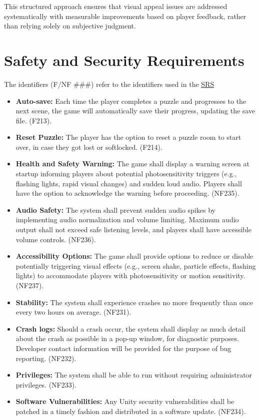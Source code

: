 \documentclass{article}
\begin{document}
This structured approach ensures that visual appeal issues are addressed systematically with measurable improvements based on player feedback, rather than relying solely on subjective judgment.

\section{Safety and Security Requirements}

The identifiers (F/NF \#\#\#) refer to the identifiers used in the \href{https://github.com/felix-hurst/Ad-Natura/blob/main/docs/SRS/SRS.pdf}{SRS}\\

\begin{itemize}
\item{\textbf{Auto-save:} Each time the player completes a puzzle and progresses to the next scene, the game will automatically save their progress, updating the save file. (F213).}
\item{\textbf{Reset Puzzle:} The player has the option to reset a puzzle room to start over, in case they got lost or softlocked. (F214).}
\item{\textbf{Health and Safety Warning:} The game shall display a warning screen at startup informing players about potential photosensitivity triggers (e.g., flashing lights, rapid visual changes) and sudden loud audio. Players shall have the option to acknowledge the warning before proceeding. (NF235).}
\item{\textbf{Audio Safety:} The system shall prevent sudden audio spikes by implementing audio normalization and volume limiting. Maximum audio output shall not exceed safe listening levels, and players shall have accessible volume controls. (NF236).}
\item{\textbf{Accessibility Options:} The game shall provide options to reduce or disable potentially triggering visual effects (e.g., screen shake, particle effects, flashing lights) to accommodate players with photosensitivity or motion sensitivity. (NF237).}
\item{\textbf{Stability:} The system shall experience crashes no more frequently than once every two hours on average. (NF231).}
\item{\textbf{Crash logs:} Should a crash occur, the system shall display as much detail about the crash as possible in a pop-up window, for diagnostic purposes. Developer contact information will be provided for the purpose of bug reporting. (NF232).}
\item{\textbf{Privileges:} The system shall be able to run without requiring administrator privileges. (NF233).}
\item{\textbf{Software Vulnerabilities:} Any Unity security vulnerabilities shall be patched in a timely fashion and distributed in a software update. (NF234).}
\end{itemize}
\end{document}
